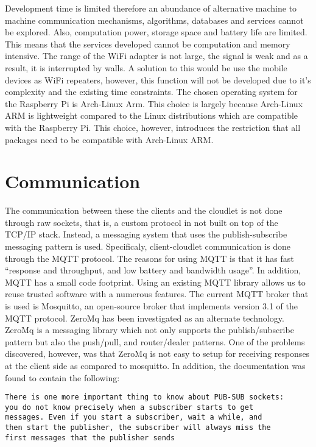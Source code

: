 Development time is limited therefore an abundance of alternative machine to machine communication mechanisms, algorithms, databases and services cannot be explored. Also, computation power, storage space
and battery life are limited. This means that the services developed cannot be computation and memory intensive. The range of the WiFi adapter is not large, the signal is weak and as a result, it is interrupted by
walls. A solution to this would be use the mobile devices as WiFi repeaters, however, this function will not be developed due to it's complexity and the existing time constraints. The chosen operating system for the
Raspberry Pi is Arch-Linux Arm. This choice is largely because Arch-Linux ARM is lightweight compared to the Linux distributions which are compatible with the Raspberry Pi. This choice, however, introduces the restriction
that all packages need to be compatible with Arch-Linux ARM.


\section{Communication}
\label{communication}

The communication between these the clients and the cloudlet is not done through raw sockets, that is, a custom protocol in not built on top of the TCP/IP stack. Instead, a messaging system that uses the publish-subscribe messaging pattern is used. Specificaly, client-cloudlet
communication is done through the MQTT protocol. The reasons for using MQTT is that it has fast “response and throughput, and low battery and bandwidth usage”\cite{Holmwebsite}. In addition, MQTT has a small
code footprint\cite{mqttwebsite}. Using an existing MQTT library allows us to reuse trusted software with a numerous features. The current MQTT broker that is used is Mosquitto, an open-source broker that implements version 3.1 of the MQTT protocol. ZeroMq has been investigated as an alternate technology.
ZeroMq is a messaging library which not only supports the publish/subscribe pattern but also the push/pull, and router/dealer patterns. One of the problems discovered, however, was that ZeroMq is not easy to setup
for receiving responses at the client side as compared to mosquitto. In addition, the documentation was found to contain the following:

\begin{verbatim}
There is one more important thing to know about PUB-SUB sockets:
you do not know precisely when a subscriber starts to get
messages. Even if you start a subscriber, wait a while, and
then start the publisher, the subscriber will always miss the
first messages that the publisher sends
\end{verbatim}

